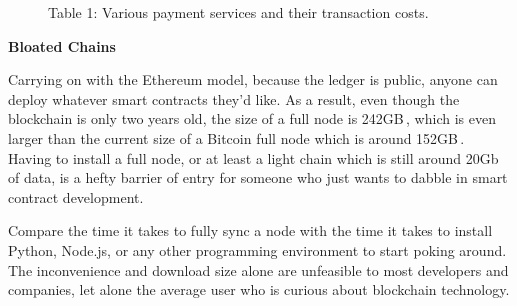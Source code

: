 \documentclass{%
	article}
\begin{document}
\begin{figure}[htbp!]
\centering
{}\par
\medskip
Table 1: Various payment services and their transaction costs.
\end{figure}


\begin{center}
\textbf{Bloated Chains}
\end{center}

Carrying on with the Ethereum model, because the ledger is public, anyone can deploy whatever smart contracts they’d like. As a result, even though the blockchain is only two years old, the size of a full node is 242GB\,\cite{ethchainsize}, which is even larger than the current size of a Bitcoin full node which is around 152GB\,\cite{btcchainsize}. Having to install a full node, or at least a light chain which is still around 20Gb of data, is a hefty barrier of entry for someone who just wants to dabble in smart contract development.

Compare the time it takes to fully sync a node with the time it takes to install Python, Node.js, or any other programming environment to start poking around. The inconvenience and download size alone are unfeasible to most developers and companies, let alone the average user who is curious about blockchain technology.
\end{document}
